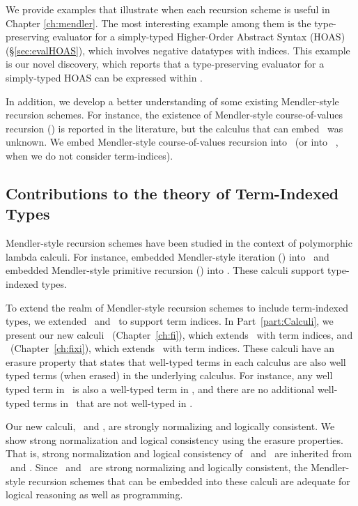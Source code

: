 We provide examples that illustrate when each recursion scheme is useful
in Chapter \ref{ch:mendler}. The most interesting example among them is
the type-preserving evaluator for a simply-typed Higher-Order Abstract Syntax
(HOAS) (\S\ref{sec:evalHOAS}), which involves negative datatypes with indices.
This example is our novel discovery, which reports that
a type-preserving evaluator for a simply-typed HOAS can be expressed within \Fw.

In addition, we develop a better understanding of some existing
Mendler-style recursion schemes. For instance, the existence of
Mendler-style course-of-values recursion (\McvPr) is reported
in the literature, but the calculus that can embed \McvPr\ was unknown.
We embed Mendler-style course-of-values recursion into \Fixi\ 
(or into \Fixw\ \cite{AbeMat04}, when we do not consider term-indices).

\subsection{Contributions to the theory of Term-Indexed Types}
Mendler-style recursion schemes have been studied in the context of
polymorphic lambda calculi. For instance, \citet{AbeMatUus03} embedded 
Mendler-style iteration (\MIt) into \Fw\ and \citet{AbeMat04} embedded
Mendler-style primitive recursion (\MPr) into \Fixw. These calculi
support type-indexed types.

To extend the realm of Mendler-style recursion schemes to include
term-indexed types, we extended \Fw\ and \Fixw\ to support term indices.
In Part~\ref{part:Calculi}, we present our new calculi
\Fi\ (Chapter~\ref{ch:fi}), which extends \Fw\ with term indices, and
\Fixi\ (Chapter~\ref{ch:fixi}), which extends \Fixw\ with term indices.
These calculi have an erasure property that states that well-typed terms
in each calculus are also well typed terms (when erased) in the 
underlying calculus. For instance, any well typed term in \Fi\ is also
a well-typed term in \Fw, and there are no additional well-typed terms
in \Fi\ that are not well-typed in \Fw.

Our new calculi, \Fi\ and \Fixi, are strongly normalizing and
logically consistent. We show strong normalization and logical consistency
using the erasure properties. That is, strong normalization and
logical consistency of \Fi\ and \Fixi\ are inherited from \Fw\ and \Fixw.
Since \Fi\ and \Fixi\ are strong normalizing and logically  consistent,
the Mendler-style recursion schemes that can be embedded into these calculi
are adequate for logical reasoning as well as programming.

